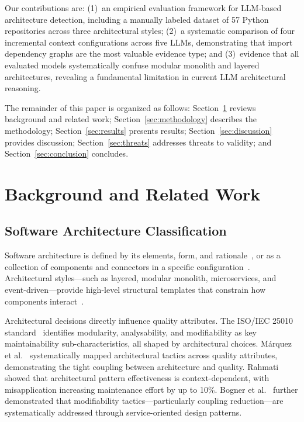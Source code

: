 \documentclass[runningheads]{llncs}
\begin{document}
Our contributions are: (1)~an empirical evaluation framework for LLM-based architecture detection, including a manually labeled dataset of 57 Python repositories across three architectural styles; (2)~a systematic comparison of four incremental context configurations across five LLMs, demonstrating that import dependency graphs are the most valuable evidence type; and (3)~evidence that all evaluated models systematically confuse modular monolith and layered architectures, revealing a fundamental limitation in current LLM architectural reasoning.

The remainder of this paper is organized as follows: Section~\ref{sec:background} reviews background and related work; Section~\ref{sec:methodology} describes the methodology; Section~\ref{sec:results} presents results; Section~\ref{sec:discussion} provides discussion; Section~\ref{sec:threats} addresses threats to validity; and Section~\ref{sec:conclusion} concludes.

\section{Background and Related Work}
\label{sec:background}

\subsection{Software Architecture Classification}

Software architecture is defined by its elements, form, and rationale~\cite{perry1992foundations}, or as a collection of components and connectors in a specific configuration~\cite{garlan1993introduction}. Architectural styles---such as layered, modular monolith, microservices, and event-driven---provide high-level structural templates that constrain how components interact~\cite{bass2021software}.

Architectural decisions directly influence quality attributes. The ISO/IEC 25010 standard~\cite{ISO25010} identifies modularity, analysability, and modifiability as key maintainability sub-characteristics, all shaped by architectural choices. M\'arquez et al.~\cite{marquez2022architectural} systematically mapped architectural tactics across quality attributes, demonstrating the tight coupling between architecture and quality. Rahmati~\cite{rahmati2021ensuring} showed that architectural pattern effectiveness is context-dependent, with misapplication increasing maintenance effort by up to 10\%. Bogner et al.~\cite{bogner2019modifiability} further demonstrated that modifiability tactics---particularly coupling reduction---are systematically addressed through service-oriented design patterns.
\end{document}
